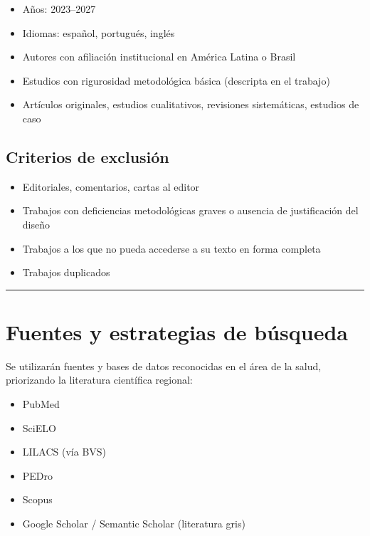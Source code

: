 \documentclass[
  letterpaper,
]{book}
\providecommand{\tightlist}{%
  \setlength{\itemsep}{0pt}\setlength{\parskip}{0pt}}\usepackage{longtable,booktabs,array}
\begin{document}
\begin{itemize}
\tightlist
\item
  Años: 2023--2027
\item
  Idiomas: español, portugués, inglés
\item
  Autores con afiliación institucional en América Latina o Brasil
\item
  Estudios con rigurosidad metodológica básica (descripta en el trabajo)
\item
  Artículos originales, estudios cualitativos, revisiones sistemáticas,
  estudios de caso
\end{itemize}

\subsection{Criterios de exclusión}\label{criterios-de-exclusiuxf3n}

\begin{itemize}
\tightlist
\item
  Editoriales, comentarios, cartas al editor
\item
  Trabajos con deficiencias metodológicas graves o ausencia de
  justificación del diseño
\item
  Trabajos a los que no pueda accederse a su texto en forma completa
\item
  Trabajos duplicados
\end{itemize}

\begin{center}\rule{0.5\linewidth}{0.5pt}\end{center}

\section{Fuentes y estrategias de
búsqueda}\label{fuentes-y-estrategias-de-buxfasqueda}

Se utilizarán fuentes y bases de datos reconocidas en el área de la
salud, priorizando la literatura científica regional:

\begin{itemize}
\tightlist
\item
  PubMed
\item
  SciELO
\item
  LILACS (vía BVS)
\item
  PEDro
\item
  Scopus
\item
  Google Scholar / Semantic Scholar (literatura gris)
\end{itemize}
\end{document}
